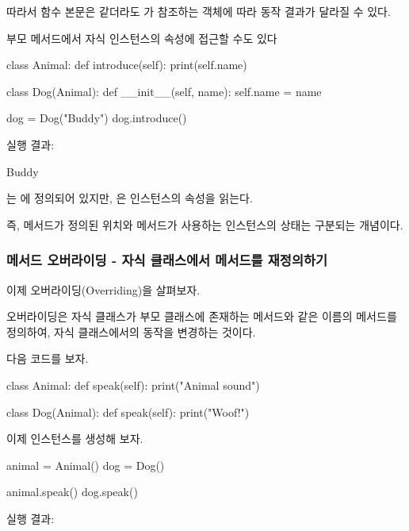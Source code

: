 따라서 함수 본문은 같더라도 가 참조하는 객체에 따라 동작 결과가 달라질 수 있다.

\begin{dhknote}
\begin{dhksmry}[centered]
부모 메서드에서 자식 인스턴스의 속성에 접근할 수도 있다
\end{dhksmry}
\end{dhknote}

\begin{dhkcode}
class Animal:
    def introduce(self):
        print(self.name)


class Dog(Animal):
    def __init__(self, name):
        self.name = name


dog = Dog("Buddy")
dog.introduce()
\end{dhkcode}

실행 결과:

\begin{dhkzsh}
Buddy
\end{dhkzsh}

는 에 정의되어 있지만, 은  인스턴스의 속성을 읽는다.

즉, 메서드가 정의된 위치와 메서드가 사용하는 인스턴스의 상태는 구분되는 개념이다.

\subsubsection{메서드 오버라이딩 - 자식 클래스에서 메서드를 재정의하기}

이제 오버라이딩(Overriding)을 살펴보자.

오버라이딩은 자식 클래스가 부모 클래스에 존재하는 메서드와 같은 이름의 메서드를 정의하여, 자식 클래스에서의 동작을 변경하는 것이다.

다음 코드를 보자.

\begin{dhkcode}
class Animal:
    def speak(self):
        print("Animal sound")


class Dog(Animal):
    def speak(self):
        print("Woof!")
\end{dhkcode}

이제 인스턴스를 생성해 보자.

\begin{dhkcode}
animal = Animal()
dog = Dog()

animal.speak()
dog.speak()
\end{dhkcode}

실행 결과:


